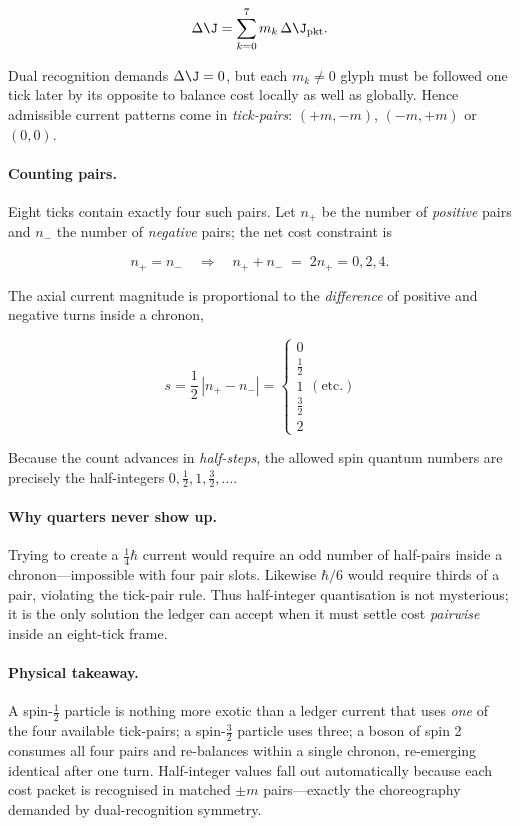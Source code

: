 \documentclass[11pt,oneside]{book}
\begin{document}
\[
   \Delta\J = \sum_{k=0}^{7} m_{k}\,\Delta\J_{\text{pkt}} .
\]

Dual recognition demands $\Delta\J=0$, but each
$m_{k}\!\neq\!0$ glyph must be followed one tick later by its opposite
to balance cost locally as well as globally.  
Hence admissible current patterns come in \emph{tick-pairs}:
$(+m,-m)$, $(-m,+m)$ or $(0,0)$.

\paragraph{Counting pairs.}
Eight ticks contain exactly four such pairs.  
Let $n_{\!+}$ be the number of \emph{positive} pairs and $n_{\!-}$ the
number of \emph{negative} pairs; the net cost constraint is

\[
   n_{\!+}=n_{\!-}\quad\Rightarrow\quad
   n_{\!+}+n_{\!-}\;=\;2n_{\!+}=0,2,4 .
\]

The axial current magnitude is proportional to the
\emph{difference} of positive and negative turns inside a chronon,

\[
   s = \frac12\,|n_{\!+}-n_{\!-}|
       = 
       \begin{cases}
         0 \\[2pt] 
         \tfrac12 \\[2pt]
         1 \\[2pt]
         \tfrac32 \\[2pt]
         2
       \end{cases}
\!(\text{etc.})
\]

Because the count advances in \emph{half-steps}, the allowed spin
quantum numbers are precisely the half-integers
$0,\tfrac12,1,\tfrac32,\dots$.

\paragraph{Why quarters never show up.}
Trying to create a $\tfrac14\hbar$ current would require an odd number
of half-pairs inside a chronon—impossible with four pair slots.
Likewise $\hbar/6$ would require thirds of a pair, violating the
tick-pair rule.  
Thus half-integer quantisation is not mysterious; it is the only
solution the ledger can accept when it must settle cost \emph{pairwise}
inside an eight-tick frame.

\paragraph{Physical takeaway.}
A spin-$\tfrac12$ particle is nothing more exotic than a ledger current
that uses \emph{one} of the four available tick-pairs;  
a spin-$\tfrac32$ particle uses three;  
a boson of spin 2 consumes all four pairs and re-balances within a
single chronon, re-emerging identical after one turn.  
Half-integer values fall out automatically because each cost packet
is recognised in matched $\pm m$ pairs—exactly the choreography
demanded by dual-recognition symmetry.
\end{document}
